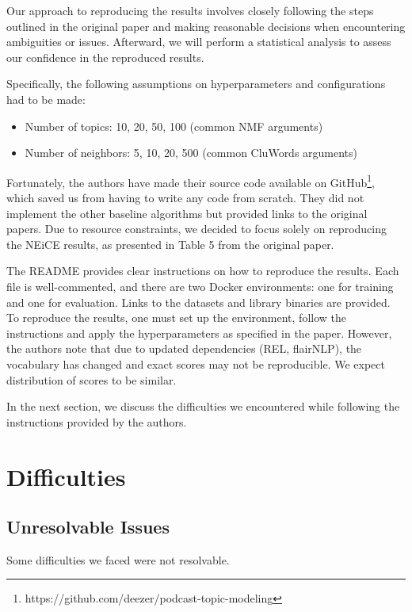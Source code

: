 \documentclass[manuscript]{acmart}
\begin{document}
Our approach to reproducing the results involves closely following the steps outlined in the original paper and making reasonable decisions when encountering ambiguities or issues. Afterward, we will perform a statistical analysis to assess our confidence in the reproduced results.

Specifically, the following assumptions on hyperparameters and configurations had to be made:

\begin{itemize}
  \item Number of topics: 10, 20, 50, 100 (common NMF arguments)
  \item Number of neighbors: 5, 10, 20, 500 (common CluWords arguments)
\end{itemize}

Fortunately, the authors have made their source code available on GitHub\footnote{https://github.com/deezer/podcast-topic-modeling}, which saved us from having to write any code from scratch. They did not implement the other baseline algorithms but provided links to the original papers. Due to resource constraints, we decided to focus solely on reproducing the NEiCE results, as presented in Table 5 from the original paper.

The README provides clear instructions on how to reproduce the results. Each file is well-commented, and there are two Docker environments: one for training and one for evaluation. Links to the datasets and library binaries are provided. To reproduce the results, one must set up the environment, follow the instructions and apply the hyperparameters as specified in the paper. However, the authors note that due to updated dependencies (REL, flairNLP), the vocabulary has changed and exact scores may not be reproducible. We expect distribution of scores to be similar.

In the next section, we discuss the difficulties we encountered while following the instructions provided by the authors.

\section{Difficulties}

\subsection{Unresolvable Issues}

Some difficulties we faced were not resolvable.
\end{document}
